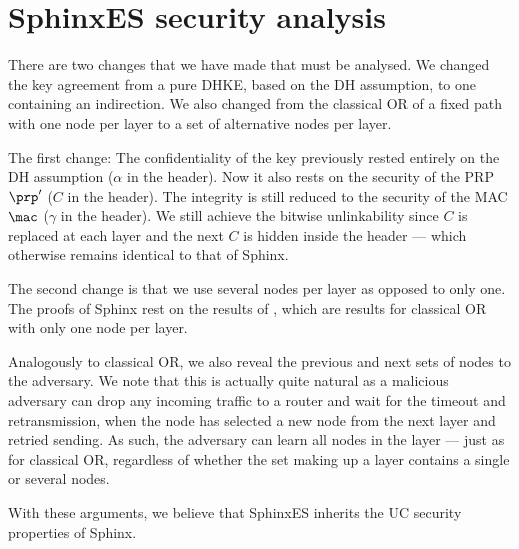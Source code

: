 \section{SphinxES security analysis}%
\label{SphinxES-security}

There are two changes that we have made that must be analysed.
We changed the key agreement from a pure \ac{DHKE}, \ie based on the \ac{DH} 
assumption, to one containing an indirection.
We also changed from the classical \ac{OR} of a fixed path with one node per 
layer to a set of alternative nodes per layer.

The first change:
The confidentiality of the key previously rested entirely on the \ac{DH} 
assumption (\(\alpha\) in the header).
Now it also rests on the security of the \ac{PRP} \(\prp'\) (\(C\) in the 
header).
The integrity is still reduced to the security of the \ac{MAC} \(\mac\) 
(\(\gamma\) in the header).
We still achieve the bitwise unlinkability since \(C\) is replaced at each 
layer and the next \(C\) is hidden inside the header --- which otherwise 
remains identical to that of \ac{Sphinx}.

The second change is that we use several nodes per layer as opposed to only 
one.
The proofs of \ac{Sphinx} rest on the results of \textcite{CLOnionRouting}, which 
are results for classical \ac{OR} with only one node per layer.

Analogously to classical \ac{OR}, we also reveal the previous and next sets of 
nodes to the adversary. We note that this is actually quite natural as a 
malicious adversary can drop any incoming traffic to a router and wait for the 
timeout and
retransmission, \ie when the 
node has selected a new node from the next layer and retried sending.
As such, the adversary can learn all nodes in the layer --- just as for 
classical \ac{OR}, regardless of whether the set making up a layer contains a
single or several nodes.

With these arguments, we believe that SphinxES inherits the \ac{UC} security 
properties of \ac{Sphinx}. %

